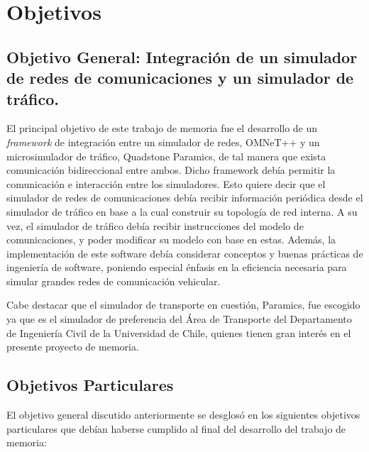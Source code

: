 \section{Objetivos}\label{sec:obj}

\subsection{Objetivo General: Integración de un simulador de redes de comunicaciones y un simulador de tráfico.}

El principal objetivo de este trabajo de memoria fue el desarrollo de un \textit{framework} de integración entre un simulador de redes, OMNeT++ y un microsimulador de tráfico, Quadstone Paramics, de tal manera que exista comunicación bidireccional entre ambos. Dicho framework debía permitir la comunicación e interacción entre los simuladores. Esto quiere decir que el simulador de redes de comunicaciones debía recibir información periódica desde el simulador de tráfico en base a la cual construir su topología de red interna. A su vez, el simulador de tráfico debía recibir instrucciones del modelo de comunicaciones, y poder modificar su modelo con base en estas.
Además, la implementación de este software debía considerar conceptos y buenas prácticas de ingeniería de software, poniendo especial énfasis en la eficiencia necesaria para simular grandes redes de comunicación vehicular.

Cabe destacar que el simulador de transporte en cuestión, Paramics, fue escogido ya que es el simulador de preferencia del Área de Transporte del Departamento de Ingeniería Civil de la Universidad de Chile, quienes tienen gran interés en el presente proyecto de memoria.


\subsection{Objetivos Particulares}\label{sec:obj:part}

El objetivo general discutido anteriormente se desglosó en los siguientes objetivos particulares que debían haberse cumplido al final del desarrollo del trabajo de memoria:

